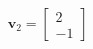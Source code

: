 \documentclass[preview]{standalone}
\begin{document}
\begin{align*}
\mathbf{v}_2=\begin{bmatrix} 2 \\ -1 \end{bmatrix}
\end{align*}
\end{document}
